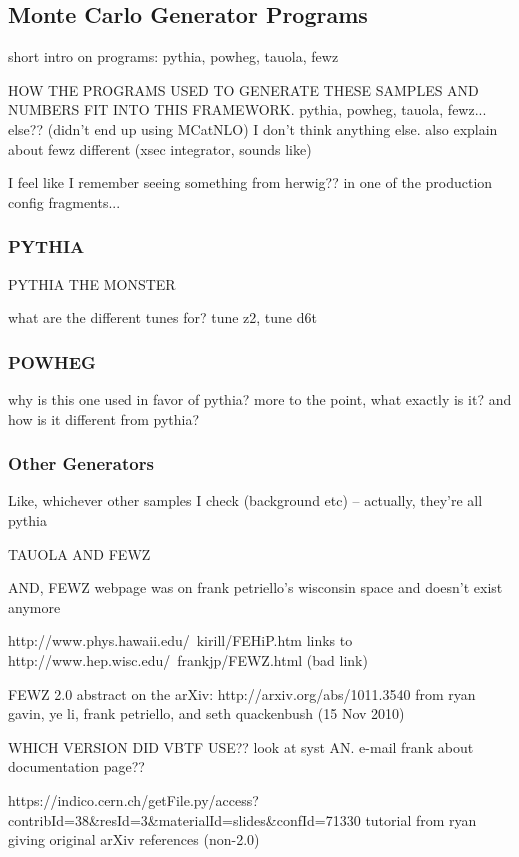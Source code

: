 \subsection{Monte Carlo Generator Programs}
\label{sim:MCGens}

short intro on programs: pythia, powheg, tauola, fewz

HOW THE PROGRAMS USED TO GENERATE THESE SAMPLES AND NUMBERS 
FIT INTO THIS FRAMEWORK.  
   pythia, powheg, tauola, fewz... else??  (didn't end up using MCatNLO) 
I don't think anything else.  
also explain about fewz different (xsec integrator, sounds like)

I feel like I remember seeing something from herwig?? in one of the 
production config fragments...

\subsubsection{PYTHIA}
\label{sim:MCGensPythia}

PYTHIA THE MONSTER

what are the different tunes for?  tune z2, tune d6t

\subsubsection{POWHEG}
\label{sim:MCGensPowheg}
why is this one used in favor of pythia?  
more to the point, what exactly is it? 
and how is it different from pythia? 

\subsubsection{Other Generators}
\label{sim:MCGensOther}
Like, whichever other samples I check (background etc) -- actually, they're all pythia

TAUOLA AND FEWZ

AND, FEWZ webpage was on frank petriello's wisconsin space and doesn't exist anymore

http://www.phys.hawaii.edu/~kirill/FEHiP.htm links to 
http://www.hep.wisc.edu/~frankjp/FEWZ.html (bad link)

FEWZ 2.0 abstract on the arXiv: http://arxiv.org/abs/1011.3540 
from ryan gavin, ye li, frank petriello, and seth quackenbush (15 Nov 2010)

WHICH VERSION DID VBTF USE??  look at syst AN.  
e-mail frank about documentation page??

https://indico.cern.ch/getFile.py/access?contribId=38\&resId=3\&materialId=slides\&confId=71330  tutorial from ryan giving original arXiv references (non-2.0)




